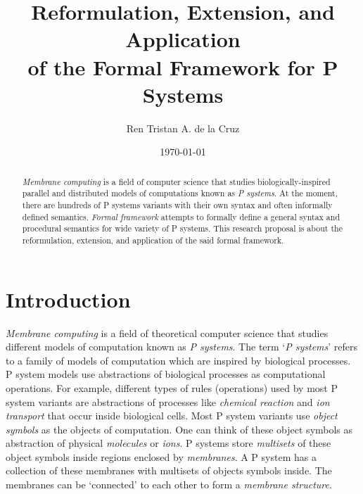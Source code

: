 \documentclass{article}
\title{Reformulation, Extension, and Application \\ of the Formal Framework for P Systems}
\author{Ren Tristan A. de la Cruz}
\date{\today}
\begin{document}

\maketitle


\begin{abstract}
\emph{Membrane computing} is a field of computer science that studies biologically-inspired 
parallel and distributed models of computations known as \emph{P systems}. At the moment, there
are hundreds of P systems variants with their own syntax and often informally defined semantics.
\emph{Formal framework} attempts to formally define a general syntax and procedural semantics for 
wide variety of P systems. This research proposal is about the reformulation, extension, and 
application of the said formal framework.
\end{abstract}


\newpage
\tableofcontents
\afterpreface


\section{Introduction}\label{s-intro}

\textit{Membrane computing} is a field of theoretical computer science that studies different models
of computation known as \textit{P systems}. The term `\textit{P systems}' refers to a family of 
models of computation which are inspired by biological processes. P system models use abstractions 
of biological processes as computational operations. For example, different types of rules 
(operations) used by most P system variants are abstractions of processes like \textit{chemical 
reaction} and \textit{ion transport} that occur inside biological cells. Most P system variants use 
\textit{object symbols} as the objects of computation. One can think of these object symbols as 
abstraction of physical \textit{molecules} or \textit{ions}. P systems store \textit{multisets} of 
these object symbols inside regions enclosed by \textit{membranes}. A P system has a collection of 
these membranes with multisets of objects symbols inside. The membranes can be `connected' to each 
other to form a \textit{membrane structure}. 
\end{document}
